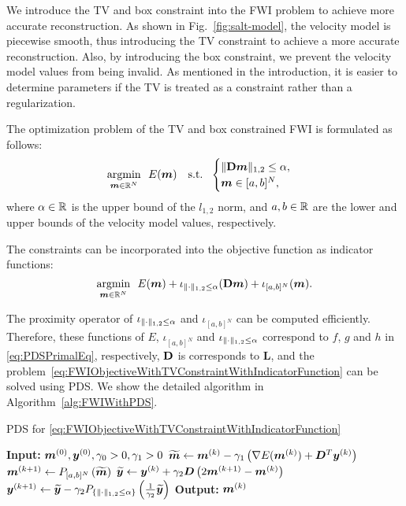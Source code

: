 We introduce the TV and box constraint into the FWI problem to achieve more accurate reconstruction.
As shown in Fig.~\ref{fig:salt-model}, the velocity model is piecewise smooth, thus introducing the TV constraint to achieve a more accurate reconstruction.
Also, by introducing the box constraint, we prevent the velocity model values from being invalid.
As mentioned in the introduction, it is easier to determine parameters if the TV is treated as a constraint rather than a regularization.

The optimization problem of the TV and box constrained FWI is formulated as follows:
\begin{equation} \label{eq:FWIObjectiveWithTVConstraint} \argmin{\velModel \in \realNumber^N} \ \ \FWIObjectiveWithTVConstraint \end{equation}
where $\alpha \in \mathbb{R}$ is the upper bound of the $l_{1,2}$ norm, and $a, b \in \mathbb{R}$ are the lower and upper bounds of the velocity model values, respectively.

The constraints can be incorporated into the objective function as indicator functions:
\begin{equation} \label{eq:FWIObjectiveWithTVConstraintWithIndicatorFunction} \argmin{\velModel \in \realNumber^N} \ \ \FWIObjectiveWithTVConstraintWithIndicatorFunction. \end{equation}

The proximity operator of $\iota_{\lVert \cdot \rVert _{1,2} \le \alpha}$ and $\iota_{[a,b]^N}$ can be computed efficiently.
Therefore, these functions of $E$, $\iota_{[a,b]^N}$ and $\iota_{\lVert \cdot \rVert _{1,2} \le \alpha}$ correspond to $f$, $g$ and $h$ in \eqref{eq:PDSPrimalEq}, respectively, $\mathbf{D}$ is corresponds to $\bm{L}$, and the problem~\eqref{eq:FWIObjectiveWithTVConstraintWithIndicatorFunction} can be solved using PDS.
We show the detailed algorithm in Algorithm~\ref{alg:FWIWithPDS}.
\begin{algorithm}[t]
    \caption{PDS for \eqref{eq:FWIObjectiveWithTVConstraintWithIndicatorFunction}}\label{alg:FWIWithPDS}
    \begin{algorithmic}[1]
        \Statex \textbf{Input:} $ \bm{m}^{(0)}, \bm{y}^{(0)}, \gamma_0 > 0, \gamma_1 > 0 $
            \State $\widetilde{\bm{m}} \leftarrow \bm{m}^{(k)} - \gamma_1 \left( \nabla E(\bm{m}^{(k)}) + \bm{D}^T \bm{y}^{(k)} \right) $
            \State $\bm{m}^{(k+1)}     \leftarrow P_{[a,b]^N} \left( \widetilde{\bm{m}} \right) $
            \State $\widetilde{\bm{y}}     \leftarrow \bm{y}^{(k)} + \gamma_2 \bm{D} \left( 2\bm{m}^{(k+1)} - \bm{m}^{(k)} \right) $
            \State $\bm{y}^{(k+1)}         \leftarrow \widetilde{\bm{y}} - \gamma_2 P_{ \{ \lVert  \cdot  \rVert _{1,2} \le \alpha \} }\left(\frac 1 {\gamma_2} {\widetilde{\bm y}}\right) $
        \EndWhile
        \Statex \textbf{Output:} $\bm{m}^{(k)}$
    \end{algorithmic}
\end{algorithm}



